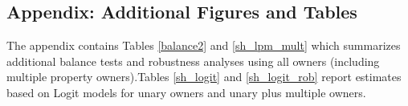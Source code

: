 \documentclass[12pt]{article}
\newcommand{\TAG}[1]{}
\begin{document}



\bigskip

\bigskip

\bigskip

\newpage

\begin{appendix}

\section{Appendix: Additional Figures and Tables}

\TAG{BEGIN_APPENDIX}

The appendix contains Tables \ref{balance2} and \ref{sh_lpm_mult}
which summarizes additional balance tests and robustness analyses
using all owners (including multiple property owners).Tables
\ref{sh_logit} and \ref{sh_logit_rob} report estimates based on Logit
models for unary owners and unary plus multiple owners.

\setcounter{table}{0}
\renewcommand{\thetable}{A\arabic{table}}



\end{appendix}
\end{document}
